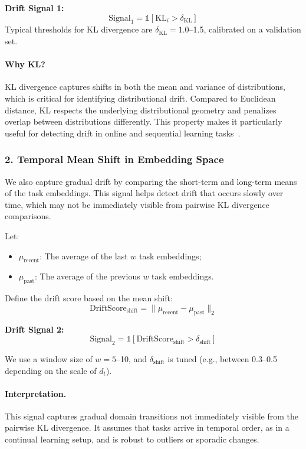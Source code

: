 \documentclass[conference]{IEEEtran}
\begin{document}
\textbf{Drift Signal 1:}
\[
\text{Signal}_1 = \mathbb{1}[\text{KL}_i > \delta_{\mathrm{KL}}]
\]
Typical thresholds for KL divergence are $\delta_{\mathrm{KL}} = 1.0$–1.5, calibrated on a validation set.

\paragraph{Why KL?}
KL divergence captures shifts in both the mean and variance of distributions, which is critical for identifying distributional drift. Compared to Euclidean distance, KL respects the underlying distributional geometry and penalizes overlap between distributions differently. This property makes it particularly useful for detecting drift in online and sequential learning tasks~\cite{gama2014survey}.

\subsubsection*{2. Temporal Mean Shift in Embedding Space}

We also capture gradual drift by comparing the short-term and long-term means of the task embeddings. This signal helps detect drift that occurs slowly over time, which may not be immediately visible from pairwise KL divergence comparisons.

Let:
\begin{itemize}
    \item $\mu_{\text{recent}}$: The average of the last $w$ task embeddings;
    \item $\mu_{\text{past}}$: The average of the previous $w$ task embeddings.
\end{itemize}

Define the drift score based on the mean shift:
\[
\text{DriftScore}_{\text{shift}} = \|\mu_{\text{recent}} - \mu_{\text{past}}\|_2
\]

\textbf{Drift Signal 2:}
\[
\text{Signal}_2 = \mathbb{1}[\text{DriftScore}_{\text{shift}} > \delta_{\text{shift}}]
\]

We use a window size of $w = 5$–10, and $\delta_{\text{shift}}$ is tuned (e.g., between 0.3–0.5 depending on the scale of $d_t$).

\paragraph{Interpretation.}
This signal captures gradual domain transitions not immediately visible from the pairwise KL divergence. It assumes that tasks arrive in temporal order, as in a continual learning setup, and is robust to outliers or sporadic changes.
\end{document}
